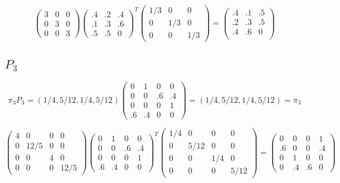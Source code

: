 \documentclass{article}
\begin{document}
\[
\left( \begin{array}{ccc}
	3&0&0\\
	0&3&0\\
    0&0&3
\end{array}\right)
\left( \begin{array}{ccc}
	.4&.2&.4\\
	.1&.3&.6\\
    .5&.5& 0
\end{array}\right)^{T} \left( \begin{array}{ccc}
	1/3	&0&0\\
	0&1/3&0\\
    0&0&1/3
\end{array}\right) = 
\left( \begin{array}{ccc}
	.4&.1&.5\\
	.2&.3&.5\\
    .4&.6&0\\
\end{array}\right)
\]
\subsection*{\underline{$P_3$}}
\[ \pi_3 P_3 =  \left( 1/4, 5/12, 1/4, 5/12 \right) \left( \begin{array}{cccc}
	0&1&0&0\\
	0&0&.6&.4\\
    0&0&0&1\\
    .6&.4&0&0
\end{array}\right)  = \left( 1/4, 5/12, 1/4, 5/12 \right) = \pi_3\]

\[
\left( \begin{array}{cccC}
	4&    0& 0&    0\\
	0& 12/5& 0&    0\\
    0&    0& 4&    0\\
    0&    0& 0& 12/5
\end{array}\right)
\left(\begin{array}{cccc}
	  0&  1&  0&  0\\
      0&  0& .6& .4\\
      0&  0&  0&  1\\
     .6& .4&  0&  0
\end{array}\right) ^{T}
\left( \begin{array}{cccc}
	1/4 & 0    &   0 &    0 \\
	0   & 5/12 &   0 &    0 \\
    0   & 0    & 1/4 &    0 \\
    0   & 0    &   0 & 5/12 
\end{array}\right) = 
\left( \begin{array}{cccc}
	 0 &  0 &  0 &  1 \\
	.6 &  0 &  0 & .4 \\
     0 &  1 &  0 &  0 \\
     0 & .4 & .6 &  0
\end{array}\right)
\]
\end{document}
